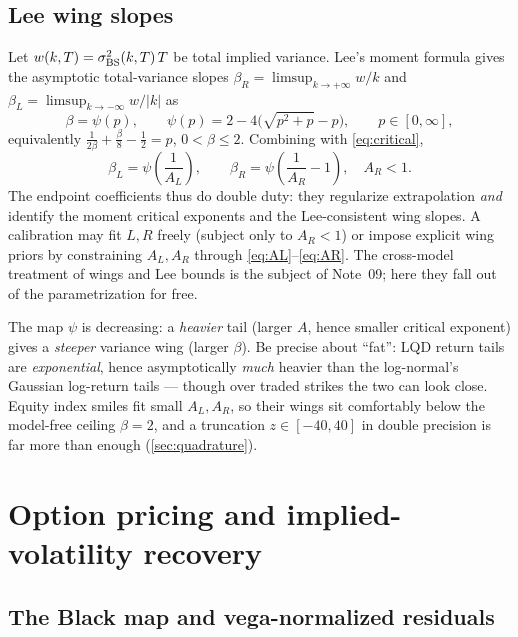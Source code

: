 \documentclass[11pt]{article}
\begin{document}
\subsection{Lee wing slopes}

Let $w(k,T)=\sigma_{\mathrm{BS}}^2(k,T)\,T$ be total implied variance. Lee's moment
formula gives the asymptotic total-variance slopes
$\beta_R=\limsup_{k\to+\infty}w/k$ and
$\beta_L=\limsup_{k\to-\infty}w/|k|$ as
\begin{equation}
\beta=\psi(p),\qquad \psi(p)=2-4\big(\sqrt{p^2+p}-p\big),
\qquad p\in[0,\infty],
\label{eq:lee_psi}
\end{equation}
equivalently $\tfrac{1}{2\beta}+\tfrac{\beta}{8}-\tfrac12=p$, $0<\beta\le2$.
Combining with \eqref{eq:critical},
\begin{equation}
\beta_L=\psi\!\left(\frac{1}{A_L}\right),
\qquad
\beta_R=\psi\!\left(\frac{1}{A_R}-1\right),\quad A_R<1.
\label{eq:lee_slopes}
\end{equation}
The endpoint coefficients thus do double duty: they regularize extrapolation
\emph{and} identify the moment critical exponents and the Lee-consistent wing
slopes. A calibration may fit $L,R$ freely (subject only to $A_R<1$) or impose
explicit wing priors by constraining $A_L,A_R$ through
\eqref{eq:AL}--\eqref{eq:AR}. The cross-model treatment of wings and Lee bounds
is the subject of Note~09; here they fall out of the parametrization for free.

\begin{heuristic}
The map $\psi$ is decreasing: a \emph{heavier} tail (larger $A$, hence smaller
critical exponent) gives a \emph{steeper} variance wing (larger $\beta$). Be
precise about ``fat'': LQD return tails are \emph{exponential}, hence
asymptotically \emph{much} heavier than the log-normal's Gaussian log-return
tails --- though over traded strikes the two can look close. Equity index
smiles fit small $A_L,A_R$, so their wings sit comfortably below the
model-free ceiling $\beta=2$, and a truncation $z\in[-40,40]$ in double
precision is far more than enough (\cref{sec:quadrature}).
\end{heuristic}

\section{Option pricing and implied-volatility recovery}
\label{sec:pricing}

\subsection{The Black map and vega-normalized residuals}
\end{document}
